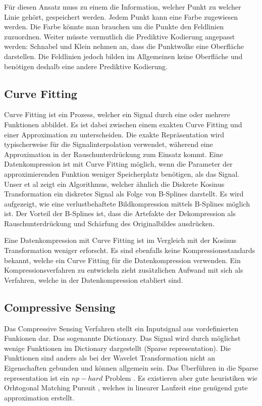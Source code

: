Für diesen Ansatz muss zu einem die Information, welcher Punkt zu welcher Linie gehört, gespeichert werden. Jedem Punkt kann eine Farbe zugewiesen werden. Die Farbe könnte man brauchen um die Punkte den Feldlinien zuzuordnen. Weiter müsste vermutlich die Prediktive Kodierung angepasst werden: Schnabel und Klein nehmen an, dass die Punktwolke eine Oberfläche darstellen. Die Feldlinien jedoch bilden im Allgemeinen keine Oberfläche und benötigen deshalb eine andere Prediktive Kodierung.

\subsection{Curve Fitting}
Curve Fitting ist ein Prozess, welcher ein Signal durch eine oder mehrere Funktionen abbildet. Es ist dabei zwischen einem exakten Curve Fitting und einer Approximation zu unterscheiden. Die exakte Repräsentation wird typischerweise für die Signalinterpolation verwendet, wäherend eine Approximation in der Rauschunterdrückung zum Einsatz kommt. Eine Datenkompression ist mit Curve Fitting möglich, wenn die Parameter der approximierenden Funktion weniger Speicherplatz benötigen, als das Signal.\\
Unser et al \cite{unser1993b:spline} zeigt ein Algorithmus, welcher ähnlich die Diskrete Kosinus Transformation ein diskretes Signal als Folge von B-Splines darstellt. Es wird aufgezeigt, wie eine verlustbehaftete Bildkompression mittels B-Splines möglich ist. Der Vorteil der B-Splines ist, dass die Artefakte der Dekompression als Rauschunterdrückung und Schärfung des Originalbildes ausdrücken.

Eine Datenkompression mit Curve Fitting ist im Vergleich mit der Kosinus Transformation weniger erforscht. Es sind ebenfalls keine Kompressionsstandards bekannt, welche ein Curve Fitting für die Datenkompression verwenden. Ein Kompressionsverfahren zu entwickeln zieht zusätzlichen Aufwand mit sich als Verfahren, welche in der Datenkompression etabliert sind.

\subsection{Compressive Sensing}
Das Compressive Sensing Verfahren stellt ein Inputsignal aus vordefinierten Funkionen dar. Das sogenannte Dictionary. Das Signal wird durch möglichst wenige Funktionen im Dictionary dargestellt (Sparse representation). Die Funktionen sind anders als bei der Wavelet Transformation nicht an Eigenschaften gebunden und können allgemein sein. Das Überführen in die Sparse representation ist ein $np-hard$ Problem \cite{wiki:npHard}. Es existieren aber gute heuristiken wie Orhtogonal Matching Pursuit \cite{tropp2007signal}, welches in linearer Laufzeit eine genügend gute approximation erstellt.\\

